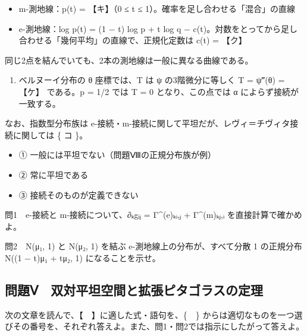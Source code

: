 \documentclass[
  10pt,
  a4paper,
]{article}
\providecommand{\tightlist}{%
  \setlength{\itemsep}{0pt}\setlength{\parskip}{0pt}}
\begin{document}
\begin{itemize}
\tightlist
\item
  m-測地線：p(t) = 【キ】（0 ≤ t ≤ 1）。確率を足し合わせる「混合」の直線
\item
  e-測地線：log p(t) = (1 − t) log p + t log q −
  c(t)。対数をとってから足し合わせる「幾何平均」の直線で、正規化定数は
  c(t) = 【ク】
\end{itemize}

同じ2点を結んでいても、2本の測地線は一般に異なる曲線である。

\begin{enumerate}
\def\labelenumi{(\arabic{enumi})}
\setcounter{enumi}{3}
\tightlist
\item
  ベルヌーイ分布の θ 座標では、T は ψ の3階微分に等しく T =
  ψ{\fallbackfont ‴}(θ) = 【ケ】 である。p = 1/2 では T = 0
  となり、この点では α によらず接続が一致する。
\end{enumerate}

なお、指数型分布族は
e-接続・m-接続に関して平坦だが、レヴィ＝チヴィタ接続に関しては \{ コ
\}。

\begin{itemize}
\tightlist
\item
  ① 一般には平坦でない（問題Ⅷの正規分布族が例）
\item
  ② 常に平坦である
\item
  ③ 接続そのものが定義できない
\end{itemize}

問1　e-接続と m-接続について、∂{\fallbackfont ₖ}g{\fallbackfont ᵢⱼ} =
Γ\^{}(e){\fallbackfont ₖᵢ},{\fallbackfont ⱼ} +
Γ\^{}(m){\fallbackfont ₖⱼ},{\fallbackfont ᵢ} を直接計算で確かめよ。

問2　N(μ{\fallbackfont ₁}, 1) と N(μ{\fallbackfont ₂}, 1) を結ぶ
e-測地線上の分布が、すべて分散 1 の正規分布 N((1 − t)μ{\fallbackfont ₁}
+ tμ{\fallbackfont ₂}, 1) になることを示せ。

\hypertarget{ux554fux984cux2174-ux53ccux5bfeux5e73ux5766ux7a7aux9593ux3068ux62e1ux5f35ux30d4ux30bfux30b4ux30e9ux30b9ux306eux5b9aux7406}{%
\subsection{問題Ⅴ　双対平坦空間と拡張ピタゴラスの定理}\label{ux554fux984cux2174-ux53ccux5bfeux5e73ux5766ux7a7aux9593ux3068ux62e1ux5f35ux30d4ux30bfux30b4ux30e9ux30b9ux306eux5b9aux7406}}

次の文章を読んで、【　】に適した式・語句を、\{　\}
からは適切なものを一つ選びその番号を、それぞれ答えよ。また、問1・問2では指示にしたがって答えよ。
\end{document}
